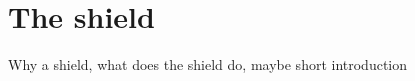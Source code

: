 \chapter{The shield}\label{cha:the-shield}

Why a shield, what does the shield do, maybe short introduction



